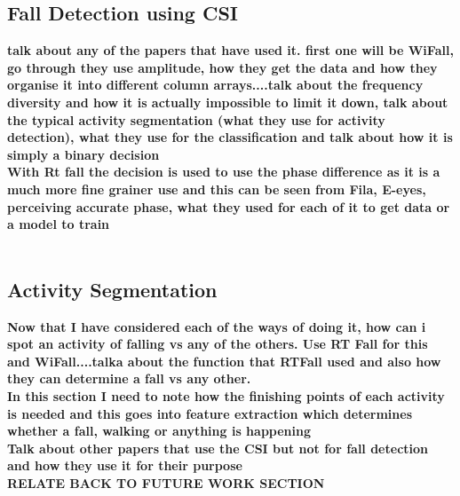 \subsection{Fall Detection using CSI}
\textbf{talk about any of the papers that have used it. first one will be WiFall, go through they use amplitude, how they get the data and how they organise it into different column arrays....talk about the frequency diversity and how it is actually impossible to limit it down, talk about the typical activity segmentation (what they use for activity detection), what they use for the classification and talk about how it is simply a binary decision \\ With Rt fall the decision is used to use the phase difference as it is a much more fine grainer use and this can be seen from Fila, E-eyes, perceiving accurate phase, what they used for each of it to get data or a model to train } \\\\





\subsection{Activity Segmentation}
\textbf{Now that I have considered each of the ways of doing it, how can i spot an activity of falling vs any of the others. Use RT Fall for this and WiFall....talka about the function that RTFall used and also how they can determine a fall vs any other. \\ In this section I need to note how the finishing points of each activity is needed and this goes into feature extraction which determines whether a fall, walking or anything is happening \\ Talk about other papers that use the CSI but not for fall detection and how they use it for their purpose \\ RELATE BACK TO FUTURE WORK SECTION} \\\\


